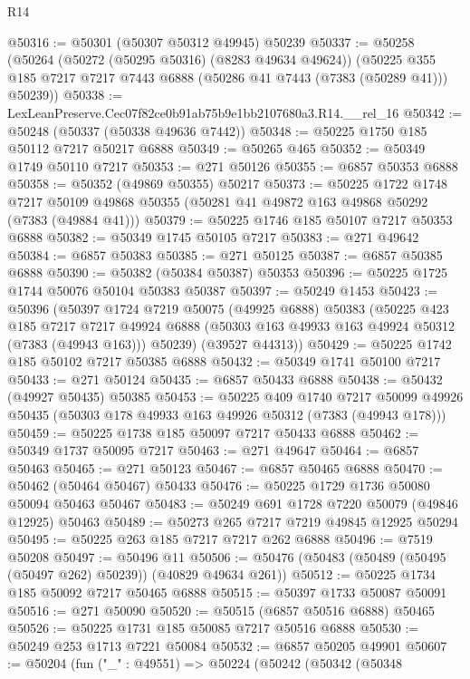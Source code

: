 \begin{lexlean}{R14}
\begin{coremodule}
@50316 := @50301 (@50307 @50312 @49945) @50239
@50337 := @50258
    (@50264
      (@50272 (@50295 @50316) (@8283 @49634 @49624))
      (@50225 @355 @185 @7217 @7217 @7443 @6888 (@50286 @41 @7443 (@7383 (@50289 @41))) @50239))
@50338 := LexLeanPreserve.Cec07f82ce0b91ab75b9e1bb2107680a3.R14.__rel_16
@50342 := @50248 (@50337 (@50338 @49636 @7442))
@50348 := @50225 @1750 @185 @50112 @7217 @50217 @6888
@50349 := @50265 @465
@50352 := @50349 @1749 @50110 @7217
@50353 := @271 @50126
@50355 := @6857 @50353 @6888
@50358 := @50352 (@49869 @50355) @50217
@50373 := @50225
    @1722
    @1748
    @7217
    @50109
    @49868
    @50355
    (@50281 @41 @49872 @163 @49868 @50292 (@7383 (@49884 @41)))
@50379 := @50225 @1746 @185 @50107 @7217 @50353 @6888
@50382 := @50349 @1745 @50105 @7217
@50383 := @271 @49642
@50384 := @6857 @50383
@50385 := @271 @50125
@50387 := @6857 @50385 @6888
@50390 := @50382 (@50384 @50387) @50353
@50396 := @50225 @1725 @1744 @50076 @50104 @50383 @50387
@50397 := @50249 @1453
@50423 := @50396
    (@50397
      @1724
      @7219
      @50075
      (@49925 @6888)
      @50383
      (@50225
        @423
        @185
        @7217
        @7217
        @49924
        @6888
        (@50303 @163 @49933 @163 @49924 @50312 (@7383 (@49943 @163)))
        @50239)
      (@39527 @44313))
@50429 := @50225 @1742 @185 @50102 @7217 @50385 @6888
@50432 := @50349 @1741 @50100 @7217
@50433 := @271 @50124
@50435 := @6857 @50433 @6888
@50438 := @50432 (@49927 @50435) @50385
@50453 := @50225
    @409
    @1740
    @7217
    @50099
    @49926
    @50435
    (@50303 @178 @49933 @163 @49926 @50312 (@7383 (@49943 @178)))
@50459 := @50225 @1738 @185 @50097 @7217 @50433 @6888
@50462 := @50349 @1737 @50095 @7217
@50463 := @271 @49647
@50464 := @6857 @50463
@50465 := @271 @50123
@50467 := @6857 @50465 @6888
@50470 := @50462 (@50464 @50467) @50433
@50476 := @50225 @1729 @1736 @50080 @50094 @50463 @50467
@50483 := @50249 @691 @1728 @7220 @50079 (@49846 @12925) @50463
@50489 := @50273 @265 @7217 @7219 @49845 @12925 @50294
@50495 := @50225 @263 @185 @7217 @7217 @262 @6888
@50496 := @7519 @50208
@50497 := @50496 @11
@50506 := @50476 (@50483 (@50489 (@50495 (@50497 @262) @50239)) (@40829 @49634 @261))
@50512 := @50225 @1734 @185 @50092 @7217 @50465 @6888
@50515 := @50397 @1733 @50087 @50091
@50516 := @271 @50090
@50520 := @50515 (@6857 @50516 @6888) @50465
@50526 := @50225 @1731 @185 @50085 @7217 @50516 @6888
@50530 := @50249 @253 @1713 @7221 @50084
@50532 := @6857 @50205 @49901
@50607 := @50204
    (fun ("_" : @49551) =>
    @50224
      (@50242
        (@50342
          (@50348

\end{coremodule}
\end{lexlean}
